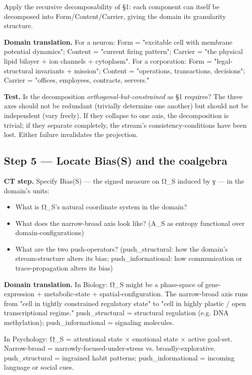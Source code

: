 \documentclass[11pt, openany]{book}
\begin{document}
Apply the recursive decomposability of §1: each component can itself be decomposed into Form/Content/Carrier, giving the domain its granularity structure.

\textbf{Domain translation.} For a neuron: Form = "excitable cell with membrane potential dynamics"; Content = "current firing pattern"; Carrier = "the physical lipid bilayer + ion channels + cytoplasm". For a corporation: Form = "legal-structural invariants + mission"; Content = "operations, transactions, decisions"; Carrier = "offices, employees, contracts, servers."

\textbf{Test.} Is the decomposition \textit{orthogonal-but-constrained} as §1 requires? The three axes should not be redundant (trivially determine one another) but should not be independent (vary freely). If they collapse to one axis, the decomposition is trivial; if they separate completely, the stream's consistency-conditions have been lost. Either failure invalidates the projection.

\subsection{Step 5 --- Locate Bias(S) and the coalgebra}

\textbf{CT step.} Specify Bias(S) --- the signed measure on Ω\_\allowbreak{}S induced by γ --- in the domain's units:

\begin{itemize}
\item What is Ω\_\allowbreak{}S's natural coordinate system in the domain?
\item What does the narrow-broad axis look like? (A\_\allowbreak{}S as entropy functional over domain-configurations)
\item What are the two push-operators? (push\_\allowbreak{}structural: how the domain's stream-structure alters its bias; push\_\allowbreak{}informational: how communication or trace-propagation alters its bias)
\end{itemize}

\textbf{Domain translation.} In Biology: Ω\_\allowbreak{}S might be a phase-space of gene-expression + metabolic-state + spatial-configuration. The narrow-broad axis runs from "cell in tightly constrained regulatory state" to "cell in highly plastic / open transcriptional regime." push\_\allowbreak{}structural = structural regulation (e.g. DNA methylation); push\_\allowbreak{}informational = signaling molecules.

In Psychology: Ω\_\allowbreak{}S = attentional state × emotional state × active goal-set. Narrow-broad = narrowly-focused-under-stress vs. broadly-explorative. push\_\allowbreak{}structural = ingrained habit patterns; push\_\allowbreak{}informational = incoming language or social cues.
\end{document}
